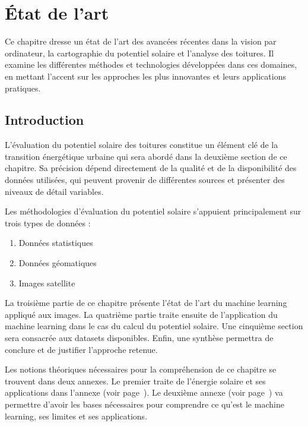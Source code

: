 
\chapter{État de l'art}
\label{chap:analysis}

Ce chapitre dresse un état de l'art des avancées récentes dans la vision par ordinateur, la cartographie du potentiel solaire et l'analyse des toitures. Il examine les différentes méthodes et technologies développées dans ces domaines, en mettant l'accent sur les approches les plus innovantes et leurs applications pratiques.

\localtableofcontents

\newpage

\section{Introduction}
L'évaluation du potentiel solaire des toitures constitue un élément clé de la transition énergétique urbaine qui sera abordé dans la deuxième section de ce chapitre. Sa précision dépend directement de la qualité et de la disponibilité des données utilisées, qui peuvent provenir de différentes sources et présenter des niveaux de détail variables.

\par{Les méthodologies d'évaluation du potentiel solaire s'appuient principalement sur trois types de données :}
\begin{enumerate}
    \item Données statistiques
    \item Données géomatiques
    \item Images satellite
\end{enumerate}

La troisième partie de ce chapitre présente l'état de l'art du machine learning appliqué aux images. La quatrième partie traite ensuite de l'application du machine learning dans le cas du calcul du potentiel solaire. Une cinquième section sera consacrée aux datasets disponibles. Enfin, une synthèse permettra de conclure et de justifier l'approche retenue.

\par{Les notions théoriques nécessaires pour la compréhension de ce chapitre se trouvent dans deux annexes. Le premier traite de  l'énergie solaire et ses applications dans l'annexe \textit{} (voir page~\pageref{chap:fondamentaux_energie}). Le deuxième annexe \textit{} (voir page~\pageref{chap:fondamentaux_ml}) va permettre d’avoir les bases nécessaires pour comprendre ce qu’est le machine learning, ses limites et ses applications.}

